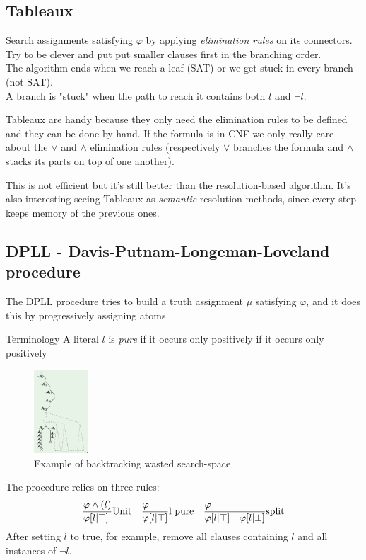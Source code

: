 \documentclass{article}
\begin{document}
\subsection{Tableaux}
Search assignments satisfying $\varphi$ by applying \textit{elimination rules} on its connectors.\\
Try to be clever and put put smaller clauses first in the branching order.\\
The algorithm ends when we reach a leaf (SAT) or we get stuck in every branch (not SAT).\\
A branch is "stuck" when the path to reach it contains both $l$ and $\neg l$.

Tableaux are handy because they only need the elimination rules to be defined and they can be done by hand.
If the formula is in CNF we only really care about the $\vee$ and $\wedge$ elimination rules (respectively $\vee$ branches the formula and $\wedge$ stacks its parts on top of one another).

This is not efficient but it's still better than the resolution-based algorithm. It's also interesting seeing Tableaux as \textit{semantic} resolution methods, since every step keeps memory of the previous ones.

\subsection{DPLL - Davis-Putnam-Longeman-Loveland procedure}
The DPLL procedure tries to build a truth assignment $\mu$ satisfying $\varphi$, and it does this by progressively assigning atoms.
\begin{callout}[blue]{Terminology}
    A literal $l$ is \textit{pure} if it occurs only positively if it occurs only positively
\end{callout}
\begin{figure}
    \includegraphics[width=0.18\textwidth]{images/PDLL_waste.png}
    \caption{Example of backtracking wasted search-space}
\end{figure}
The procedure relies on three rules:
\begin{gather*}
    \begin{array}{lcr}
        \st[Unit]{\varphi [l|\top]}{\varphi \wedge (l)} &
        \st[l pure]{\varphi [l|\top]}{\varphi} &
        \st[split]{\varphi[l|\top]\quad \varphi[l|\bot]}{\varphi}
    \end{array}
\end{gather*}
After setting $l$ to true, for example, remove all clauses containing $l$ and all instances of $\neg l$.
\end{document}
